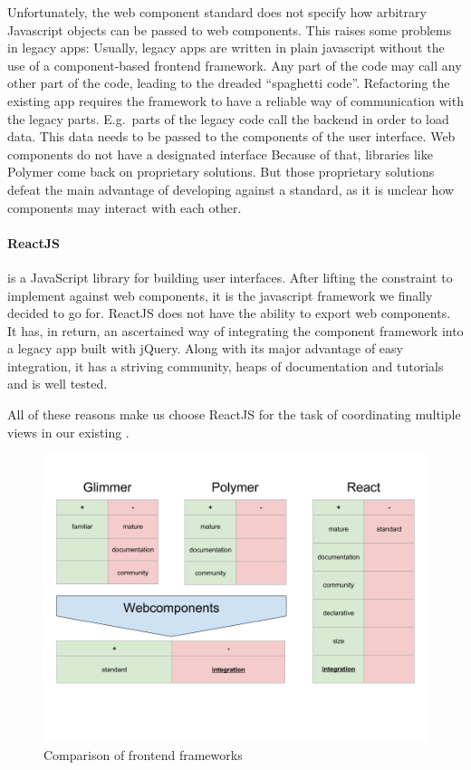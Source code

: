 Unfortunately, the web component standard does not specify how arbitrary Javascript objects can be passed to web components.
This raises some problems in legacy apps:
Usually, legacy apps are written in plain javascript without the use of a component-based frontend framework.
Any part of the code may call any other part of the code, leading to the dreaded ``spaghetti code''.
Refactoring the existing app requires the framework to have a reliable way of communication with the legacy parts.
E.g.\ parts of the legacy code call the backend in order to load data.
This data needs to be passed to the components of the user interface.
Web components do not have a designated interface
Because of that, libraries like Polymer come back on proprietary solutions.
But those proprietary solutions defeat the main advantage of developing against a standard, as it is unclear how components may interact with each other.

\paragraph{ReactJS} is a JavaScript library for building user interfaces\cite{React2017}.
After lifting the constraint to implement against web components, it is the javascript framework we finally decided to go for.
ReactJS does not have the ability to export web components.
It has, in return, an ascertained way of integrating the component framework into a legacy app built with jQuery.
Along with its major advantage of easy integration, it has a striving community, heaps of documentation and tutorials and is well tested.

All of these reasons make us choose ReactJS for the task of coordinating multiple views in our existing \visan{}.




\begin{figure}[h!]
  \centering
  \includegraphics[width=\textwidth]{images/frontend-frameworks.png}
  \caption{Comparison of frontend frameworks}\label{fig:implementation:frontend-frameworks}
\end{figure}


